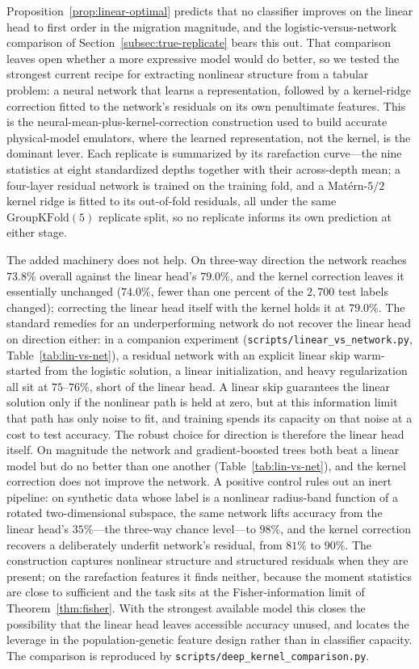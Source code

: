 \documentclass[11pt]{article}
\theoremstyle{plain}
\theoremstyle{definition}
\theoremstyle{remark}
\begin{document}
Proposition~\ref{prop:linear-optimal} predicts that no classifier improves on the linear head to
first order in the migration magnitude, and the logistic-versus-network comparison of
Section~\ref{subsec:true-replicate} bears this out. That comparison leaves open whether a more
expressive model would do better, so we tested the strongest current recipe for extracting nonlinear
structure from a tabular problem: a neural network that learns a representation, followed by a
kernel-ridge correction fitted to the network's residuals on its own penultimate features. This is
the neural-mean-plus-kernel-correction construction used to build accurate physical-model emulators,
where the learned representation, not the kernel, is the dominant lever. Each replicate is summarized
by its rarefaction curve---the nine statistics at eight standardized depths together with their
across-depth mean; a four-layer residual network is trained on the training fold, and a
Mat\'ern-$5/2$ kernel ridge is fitted to its out-of-fold residuals, all under the same
$\mathrm{GroupKFold}(5)$ replicate split, so no replicate informs its own prediction at either stage.

The added machinery does not help. On three-way direction the network reaches $73.8\%$ overall
against the linear head's $79.0\%$, and the kernel correction leaves it essentially unchanged
($74.0\%$, fewer than one percent of the $2{,}700$ test labels changed); correcting the linear head
itself with the kernel holds it at $79.0\%$. The standard remedies for an underperforming network do not recover the linear head on direction either: in a companion experiment (\texttt{scripts/linear\_vs\_network.py}, Table~\ref{tab:lin-vs-net}), a residual network with an explicit linear skip warm-started from the logistic solution, a linear initialization, and heavy regularization all sit at $75$--$76\%$, short of the linear head. A linear skip guarantees the linear solution only if the nonlinear path is held at zero, but at this information limit that path has only noise to fit, and training spends its capacity on that noise at a cost to test accuracy. The robust choice for direction is therefore the linear head itself. On magnitude the network and gradient-boosted trees both beat a linear model but do no better than one another (Table~\ref{tab:lin-vs-net}), and the kernel correction does not improve the network. A positive control rules out an inert
pipeline: on synthetic data whose label is a nonlinear radius-band function of a rotated
two-dimensional subspace, the same network lifts accuracy from the linear head's $35\%$---the
three-way chance level---to $98\%$, and the kernel correction recovers a deliberately underfit
network's residual, from $81\%$ to $90\%$. The construction captures nonlinear structure and
structured residuals when they are present; on the rarefaction features it finds neither, because the
moment statistics are close to sufficient and the task sits at the Fisher-information limit of
Theorem~\ref{thm:fisher}. With the strongest available model this closes the possibility that the
linear head leaves accessible accuracy unused, and locates the leverage in the population-genetic
feature design rather than in classifier capacity. The comparison is reproduced by
\texttt{scripts/deep\_kernel\_comparison.py}.
\end{document}
